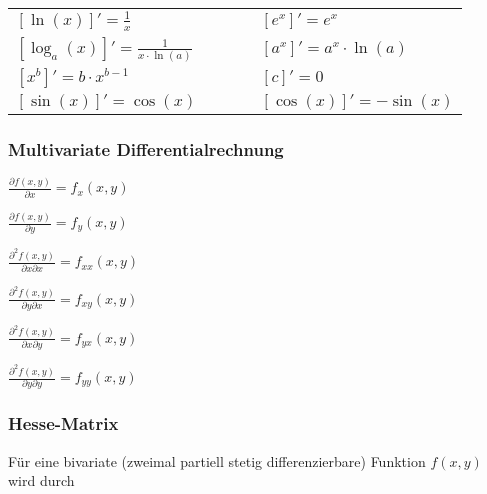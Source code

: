 \documentclass[9pt,ngerman,a4paper,landscape]{scrartcl}
\providecommand{\tightlist}{%
  \setlength{\itemsep}{0pt}\setlength{\parskip}{0pt}}
\begin{document}
\begin{multicols}{3}
\begin{tabular}{ l c l }
    $\displaystyle\left[\ln(x)\right]' = \frac{1}{x}$                       & $\qquad$  & $\displaystyle\left[e^x\right]' =     e^x$            \\[0.75em]  
    $\displaystyle\left[\log_a (x)\right]' = \frac{1}{x \cdot \ln(a)}$      & $\qquad$  & $\displaystyle\left[a^x\right]' = a^x \cdot \ln (a)$  \\[0.75em]
    $\displaystyle\left[x^b\right]' = b \cdot x^{b-1}$                      & $\qquad$  & $\displaystyle\left[c\right]'  = 0$                   \\[0.75em]
    $\displaystyle\left[\sin(x)\right]' = \cos(x)$                          & $\qquad$  & $\displaystyle\left[\cos(x)\right]'    = -\sin(x)$    \\[0.5em]
\end{tabular}

\hypertarget{multivariate-differentialrechnung}{%
\subsubsection{Multivariate
Differentialrechnung}\label{multivariate-differentialrechnung}}

\begin{description}
\tightlist
\item[Partielle Ableitungen erster Ordnung]
\(\displaystyle \frac{\partial f(x,y)}{\partial x} = f_x(x,y)\)

\(\displaystyle \frac{\partial f(x,y)}{\partial y} = f_y(x,y)\)
\item[Partielle Ableitungen zweiter Ordnung]
\(\displaystyle \frac{\partial^2 f(x,y)}{\partial x\partial x} = f_{xx}(x,y)\)

\(\displaystyle \frac{\partial^2 f(x,y)}{\partial y\partial x} = f_{xy}(x,y)\)

\(\displaystyle \frac{\partial^2 f(x,y)}{\partial x\partial y} = f_{yx}(x,y)\)

\(\displaystyle \frac{\partial^2 f(x,y)}{\partial y\partial y} = f_{yy}(x,y)\)
\end{description}

\hypertarget{hesse-matrix}{%
\subsubsection{Hesse-Matrix}\label{hesse-matrix}}

Für eine bivariate (zweimal partiell stetig differenzierbare) Funktion
\(f(x,y)\) wird durch


\end{multicols}
\end{document}

